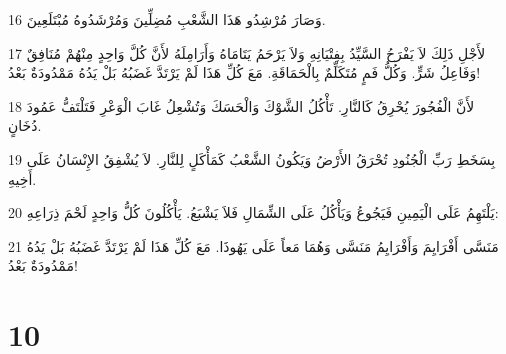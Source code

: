\par 16 وَصَارَ مُرْشِدُو هَذَا الشَّعْبِ مُضِلِّينَ وَمُرْشَدُوهُ مُبْتَلَعِينَ.
\par 17 لأَجْلِ ذَلِكَ لاَ يَفْرَحُ السَّيِّدُ بِفِتْيَانِهِ وَلاَ يَرْحَمُ يَتَامَاهُ وَأَرَامِلَهُ لأَنَّ كُلَّ وَاحِدٍ مِنْهُمْ مُنَافِقٌ وَفَاعِلُ شَرٍّ. وَكُلُّ فَمٍ مُتَكَلِّمٌ بِالْحَمَاقَةِ. مَعَ كُلِّ هَذَا لَمْ يَرْتَدَّ غَضَبُهُ بَلْ يَدُهُ مَمْدُودَةٌ بَعْدُ!
\par 18 لأَنَّ الْفُجُورَ يُحْرِقُ كَالنَّارِ. تَأْكُلُ الشَّوْكَ وَالْحَسَكَ وَتُشْعِلُ غَابَ الْوَعْرِ فَتَلْتَفُّ عَمُودَ دُخَانٍ.
\par 19 بِسَخَطِ رَبِّ الْجُنُودِ تُحْرَقُ الأَرْضُ وَيَكُونُ الشَّعْبُ كَمَأْكَلٍ لِلنَّارِ. لاَ يُشْفِقُ الإِنْسَانُ عَلَى أَخِيهِ.
\par 20 يَلْتَهِمُ عَلَى الْيَمِينِ فَيَجُوعُ وَيَأْكُلُ عَلَى الشِّمَالِ فَلاَ يَشْبَعُ. يَأْكُلُونَ كُلُّ وَاحِدٍ لَحْمَ ذِرَاعِهِ:
\par 21 مَنَسَّى أَفْرَايِمَ وَأَفْرَايِمُ مَنَسَّى وَهُمَا مَعاً عَلَى يَهُوذَا. مَعَ كُلِّ هَذَا لَمْ يَرْتَدَّ غَضَبُهُ بَلْ يَدُهُ مَمْدُودَةٌ بَعْدُ!

\chapter{10}

